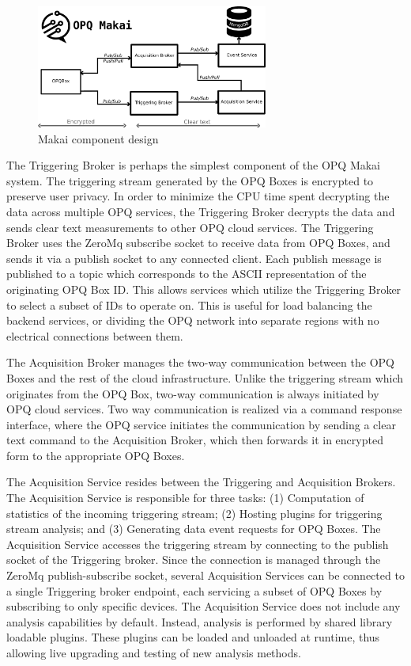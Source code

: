 \begin{figure}
\center \includegraphics[width=3in]{images/makai/makai_main.pdf}
\caption{Makai component design}
\label{fig:makai-design}
\end{figure}

The Triggering Broker is perhaps the simplest component of the OPQ Makai system. The triggering stream generated by the OPQ Boxes is encrypted to preserve user privacy. In order to minimize the CPU time spent decrypting the data across multiple OPQ services, the Triggering Broker decrypts the data and sends clear text measurements to other OPQ cloud services. The Triggering Broker uses the ZeroMq subscribe socket to receive data from OPQ Boxes, and sends it via a publish socket to any connected client. Each publish message is published to a topic which corresponds to the ASCII representation of the originating OPQ Box ID. This allows services which utilize the Triggering Broker to select a subset of IDs to operate on. This is useful for load balancing the backend services, or dividing the OPQ network into separate regions with no electrical connections between them.

The Acquisition Broker manages the two-way communication between the OPQ Boxes and the rest of the cloud infrastructure. Unlike the triggering stream which originates from the OPQ Box, two-way communication is always initiated by OPQ cloud services. Two way communication is realized via a command response interface, where the OPQ service initiates the communication by sending a clear text command to the Acquisition Broker, which then forwards it in encrypted form to the appropriate OPQ Boxes.

The Acquisition Service resides between the Triggering and Acquisition Brokers. The Acquisition Service is responsible for three tasks:
(1) Computation of statistics of the incoming triggering stream; (2) Hosting plugins for triggering stream analysis; and (3) Generating data event requests for OPQ Boxes. The Acquisition Service accesses the triggering stream by connecting to the publish socket of the Triggering broker. Since the connection is managed through the ZeroMq publish-subscribe socket, several Acquisition Services can be connected to a single Triggering broker endpoint, each servicing a subset of OPQ Boxes by subscribing to only specific devices. The Acquisition Service does not include any analysis capabilities by default. Instead, analysis is performed by shared library loadable plugins. These plugins can be loaded and unloaded at runtime, thus allowing live upgrading and testing of new analysis methods.


